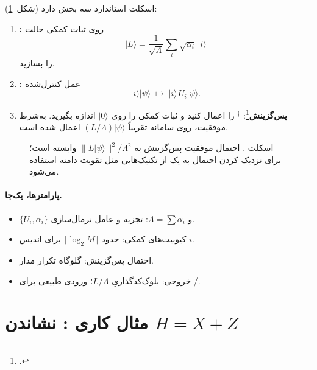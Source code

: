 اسکلت استاندارد سه بخش دارد (شکل~\ref{fig:lcu-flow}):
\begin{enumerate}
	\item \textbf{:} روی ثبات کمکی حالت
	\begin{equation}
		\lvert L\rangle
		=
		\frac{1}{\sqrt{\Lambda}}\sum_i\sqrt{\alpha_i}\,\lvert i\rangle
	\end{equation}
	را بسازید.
	\item \textbf{:} عمل کنترل‌شده
	\begin{equation}
		\lvert i\rangle\lvert\psi\rangle \;\longmapsto\; \lvert i\rangle\,U_i\lvert\psi\rangle.
	\end{equation}
	\item \textbf{پس‌گزینش}\footnote{.}: $^\dagger$ را اعمال کنید و ثبات کمکی را روی $\lvert0\rangle$ اندازه بگیرید. به‌شرط موفقیت، روی سامانه تقریباً $(L/\Lambda)\lvert\psi\rangle$ اعمال شده است.
\end{enumerate}

\begin{figure}[htbp]
	\centering
	\begin{latin}
		\resizebox{\ifdim\width>\textwidth\textwidth\else\width\fi}{!}{%
		}
	\end{latin}
	\caption{اسکلت . احتمال موفقیت پس‌گزینش به $\lVert L\lvert\psi\rangle\rVert^2/\Lambda^2$ وابسته است؛ برای نزدیک کردن احتمال به یک از تکنیک‌هایی مثل تقویت دامنه استفاده می‌شود.}
	\label{fig:lcu-flow}
\end{figure}

\paragraph{پارامترها، یک‌جا.}
\begin{itemize}
	\item $\{U_i,\alpha_i\}$ و $\Lambda=\sum\alpha_i$: تجزیه و عامل نرمال‌سازی.
	\item کیوبیت‌های کمکی: حدود $\lceil\log_2 M\rceil$ برای اندیس $i$.
	\item احتمال پس‌گزینش: گلوگاه تکرار مدار.
	\item خروجی: بلوک‌کدگذاریِ $L/\Lambda$؛ ورودی طبیعی برای /.
\end{itemize}

\section{مثال کاری : نشاندن $H=X+Z$}
\label{sec:lcu-example}

